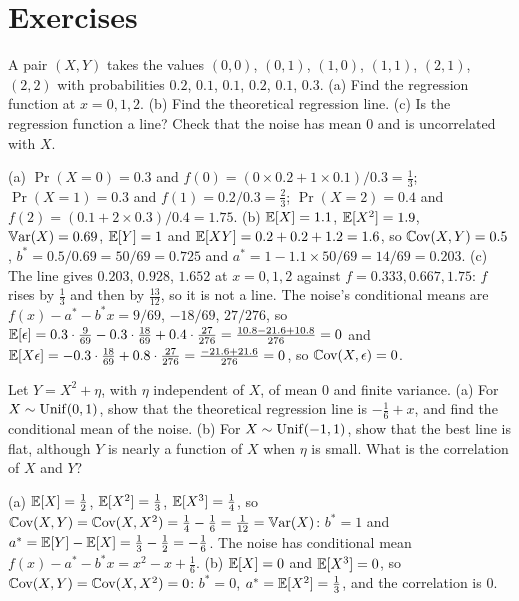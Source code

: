 \section{Exercises}
\label{sec:reg-exercises}

\begin{exercise}
\label{ex:reg-discrete}
A pair $(X, Y)$ takes the values $(0, 0)$, $(0, 1)$, $(1, 0)$, $(1, 1)$, $(2, 1)$, $(2, 2)$ with probabilities $0.2$, $0.1$, $0.1$, $0.2$, $0.1$, $0.3$. (a) Find the regression function at $x = 0, 1, 2$. (b) Find the theoretical regression line. (c) Is the regression function a line? Check that the noise has mean $0$ and is uncorrelated with $X$.
\end{exercise}
\begin{solution}
(a) $\Pr(X = 0) = 0.3$ and $f(0) = (0 \times 0.2 + 1 \times 0.1)/0.3 = \frac13$; $\Pr(X = 1) = 0.3$ and $f(1) = 0.2/0.3 = \frac23$; $\Pr(X = 2) = 0.4$ and $f(2) = (0.1 + 2 \times 0.3)/0.4 = 1.75$. (b) $\operatorname*{\mathbb{E}}[X] = 1.1$, $\operatorname*{\mathbb{E}}[X^2] = 1.9$, $\operatorname*{\mathbb{V}\text{ar}}(X) = 0.69$, $\operatorname*{\mathbb{E}}[Y] = 1$ and $\operatorname*{\mathbb{E}}[XY] = 0.2 + 0.2 + 1.2 = 1.6$, so $\operatorname*{\mathbb{C}\text{ov}}(X, Y) = 0.5$, $b^* = 0.5/0.69 = 50/69 = 0.725$ and $a^* = 1 - 1.1 \times 50/69 = 14/69 = 0.203$. (c) The line gives $0.203$, $0.928$, $1.652$ at $x = 0, 1, 2$ against $f = 0.333, 0.667, 1.75$: $f$ rises by $\frac13$ and then by $\frac{13}{12}$, so it is not a line. The noise's conditional means are $f(x) - a^* - b^*x = 9/69$, $-18/69$, $27/276$, so $\operatorname*{\mathbb{E}}[\epsilon] = 0.3 \cdot \frac{9}{69} - 0.3 \cdot \frac{18}{69} + 0.4 \cdot \frac{27}{276} = \frac{10.8 - 21.6 + 10.8}{276} = 0$ and $\operatorname*{\mathbb{E}}[X\epsilon] = -0.3 \cdot \frac{18}{69} + 0.8 \cdot \frac{27}{276} = \frac{-21.6 + 21.6}{276} = 0$, so $\operatorname*{\mathbb{C}\text{ov}}(X, \epsilon) = 0$.
\end{solution}

\begin{exercise}
\label{ex:reg-quadratic}
Let $Y = X^2 + \eta$, with $\eta$ independent of $X$, of mean $0$ and finite variance. (a) For $X \sim \mathrm{Unif}(0, 1)$, show that the theoretical regression line is $-\frac16 + x$, and find the conditional mean of the noise. (b) For $X \sim \mathrm{Unif}(-1, 1)$, show that the best line is flat, although $Y$ is nearly a function of $X$ when $\eta$ is small. What is the correlation of $X$ and $Y$?
\end{exercise}
\begin{solution}
(a) $\operatorname*{\mathbb{E}}[X] = \frac12$, $\operatorname*{\mathbb{E}}[X^2] = \frac13$, $\operatorname*{\mathbb{E}}[X^3] = \frac14$, so $\operatorname*{\mathbb{C}\text{ov}}(X, Y) = \operatorname*{\mathbb{C}\text{ov}}(X, X^2) = \frac14 - \frac16 = \frac1{12} = \operatorname*{\mathbb{V}\text{ar}}(X)$: $b^* = 1$ and $a^* = \operatorname*{\mathbb{E}}[Y] - \operatorname*{\mathbb{E}}[X] = \frac13 - \frac12 = -\frac16$. The noise has conditional mean $f(x) - a^* - b^*x = x^2 - x + \frac16$. (b) $\operatorname*{\mathbb{E}}[X] = 0$ and $\operatorname*{\mathbb{E}}[X^3] = 0$, so $\operatorname*{\mathbb{C}\text{ov}}(X, Y) = \operatorname*{\mathbb{C}\text{ov}}(X, X^2) = 0$: $b^* = 0$, $a^* = \operatorname*{\mathbb{E}}[X^2] = \frac13$, and the correlation is $0$.
\end{solution}


